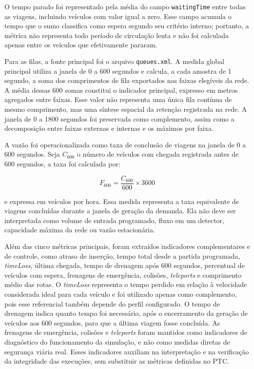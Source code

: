 O tempo parado foi representado pela média do campo \texttt{waitingTime} entre todas as viagens, incluindo veículos com valor igual a zero. Esse campo acumula o tempo que o \gls{sumo} classifica como espera segundo seu critério interno; portanto, a métrica não representa todo período de circulação lenta e não foi calculada apenas entre os veículos que efetivamente pararam.

Para as filas, a fonte principal foi o arquivo \texttt{queues.xml}. A medida global principal utiliza a janela de 0 a 600 segundos e calcula, a cada amostra de 1 segundo, a soma dos comprimentos de fila exportados nas faixas elegíveis da rede. A média dessas 600 somas constitui o indicador principal, expresso em metros agregados entre faixas. Esse valor não representa uma única fila contínua de mesmo comprimento, mas uma síntese espacial da retenção registrada na rede. A janela de 0 a 1800 segundos foi preservada como complemento, assim como a decomposição entre faixas externas e internas e os máximos por faixa.

A vazão foi operacionalizada como taxa de conclusão de viagens na janela de 0 a 600 segundos. Seja \(C_{600}\) o número de veículos com chegada registrada antes de 600 segundos, a taxa foi calculada por:

\[
F_{600} = \frac{C_{600}}{600} \times 3600
\]

e expressa em veículos por hora. Essa medida representa a taxa equivalente de viagens concluídas durante a janela de geração da demanda. Ela não deve ser interpretada como volume de entrada programado, fluxo em um detector, capacidade máxima da rede ou vazão estacionária.

Além das cinco métricas principais, foram extraídos indicadores complementares e de controle, como atraso de inserção, tempo total desde a partida programada, \textit{timeLoss}, última chegada, tempo de drenagem após 600 segundos, percentual de veículos com espera, frenagens de emergência, colisões, \textit{teleports} e comprimento médio das rotas. O \textit{timeLoss} representa o tempo perdido em relação à velocidade considerada ideal para cada veículo e foi utilizado apenas como complemento, pois esse referencial também depende do perfil configurado. O tempo de drenagem indica quanto tempo foi necessário, após o encerramento da geração de veículos aos 600 segundos, para que a última viagem fosse concluída. As frenagens de emergência, colisões e \textit{teleports} foram mantidos como indicadores de diagnóstico do funcionamento da simulação, e não como medidas diretas de segurança viária real. Esses indicadores auxiliam na interpretação e na verificação da integridade das execuções, sem substituir as métricas definidas no PTC.

